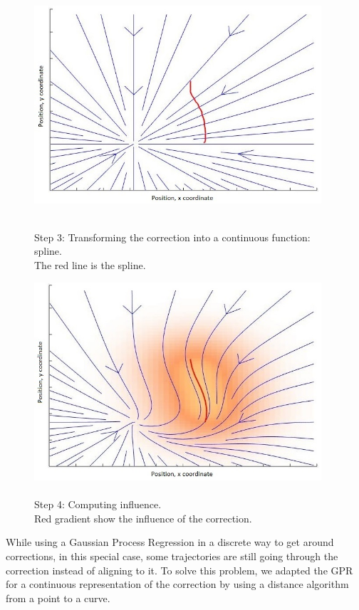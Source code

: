 \begin{figure}[H]
    \begin{minipage}[b]{0.5\linewidth}
        \centering 
        \includegraphics[width=0.95\textwidth]{img/step_3_cont.jpg}
        \caption{\\\hspace{0cm}Step 3: Transforming the correction into a continuous function: spline.\\\hspace{0cm}The red line is the spline.}
        \label{step3_process}
    \end{minipage}
    \begin{minipage}[b]{0.5\linewidth}
        \centering 
        \includegraphics[width=0.95\textwidth]{img/step_4_GPR.jpg}
        \caption{\\\hspace{0cm}Step 4: Computing influence.\\\hspace{0cm}Red gradient show the influence of the correction.}
        \label{step4_process}
    \end{minipage}\hfill
\end{figure}

While using a Gaussian Process Regression in a discrete way to get around corrections, in this special case, some trajectories are still going through the correction instead of aligning to it. To solve this problem, we adapted the GPR for a continuous representation of the correction by using a distance algorithm from a point to a curve.\\